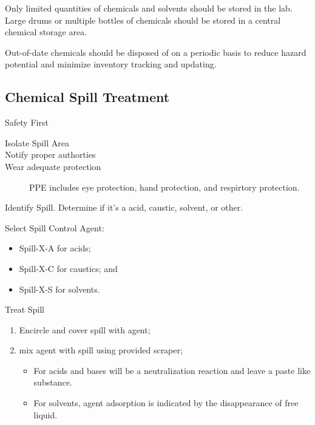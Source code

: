 \documentclass[12pt]{../SOP3}\usepackage[]{graphicx}\usepackage[]{color}
\begin{document}
\NP Only limited quantities of chemicals and solvents should be stored in the lab. Large drums or multiple bottles of chemicals should be stored in a central chemical storage area.

\NP Out-of-date chemicals should be disposed of on a periodic basis to reduce hazard potential and minimize inventory tracking and updating.

\subsection*{Chemical Spill Treatment}

\NP Safety First

\begin{description}
\item[Isolate Spill Area]
\item[Notify proper authorties]
\item[Wear adequate protection] PPE includes eye protection, hand protection, and respirtory protection. 
\end{description}

\NP Identify Spill. Determine if it's a acid, caustic, solvent, or other. 

\NP Select Spill Control Agent:

\begin{itemize}
  \item Spill-X-A for acids;
  \item Spill-X-C for caustics; and
  \item Spill-X-S for solvents.
\end{itemize}

\NP Treat Spill 

\begin{enumerate}
  \item Encircle and cover spill with agent;
  \item mix agent with spill using provided scraper; 
\begin{itemize}
  \item For acids and bases will be a neutralization reaction and leave a paste like substance. 
  \item For solvents, agent adsorption is indicated by the disappearance of free liquid.
\end{itemize} 
\end{enumerate}
  
\end{document}
